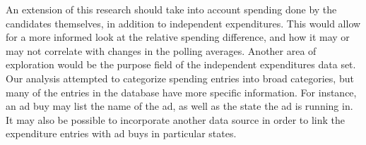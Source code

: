 \documentclass[11pt]{article}\usepackage{graphicx, color}
\begin{document}
An extension of this research should take into account spending done by the candidates themselves, in addition to independent expenditures. This would allow for a more informed look at the relative spending difference, and how it may or may not correlate with changes in the polling averages. Another area of exploration would be the purpose field of the independent expenditures data set. Our analysis attempted to categorize spending entries into broad categories, but many of the entries in the database have more specific information. For instance, an ad buy may list the name of the ad, as well as the state the ad is running in. It may also be possible to incorporate another data source in order to link the expenditure entries with ad buys in particular states.

\printbibliography
\end{document}

